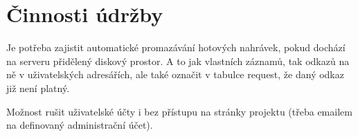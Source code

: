 \chapter{Činnosti údržby}

Je potřeba zajistit automatické promazávání hotových nahrávek, pokud dochází na serveru přidělený diskový prostor. A to jak vlastních záznamů, tak odkazů na ně v uživatelských adresářích, ale také označit v tabulce request, že daný odkaz již není platný.

\vspace{10pt}

Možnost rušit uživatelské účty i bez přístupu na stránky projektu (třeba emailem na definovaný administrační účet).

\vspace{10pt}

